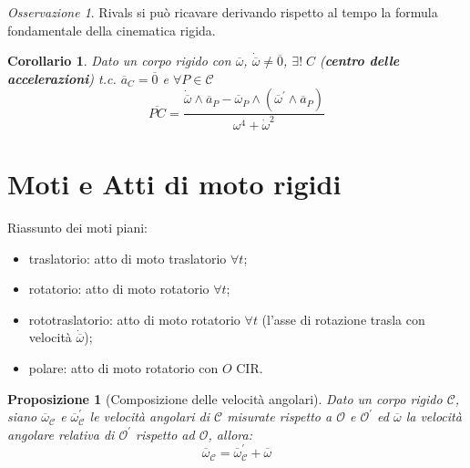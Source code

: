 \documentclass{book}
\theoremstyle{plain}
\theoremstyle{plain}
\theoremstyle{plain}
\theoremstyle{plain}
\newtheorem*{cor}{Corollario}
\theoremstyle{plain}
\newtheorem{prop}{Proposizione}[chapter]
\theoremstyle{definition}
\theoremstyle{remark}
\newtheorem*{oss}{Osservazione}
\theoremstyle{definition}
\begin{document}
\begin{oss}
    Rivals si può ricavare derivando rispetto al tempo la formula fondamentale della cinematica rigida.
\end{oss}

\begin{cor}
    Dato un corpo rigido con $\overline{\omega}$, $\dot{\overline{\omega}} \neq \overline{0}$, $\exists!\;C$ (\textbf{centro delle accelerazioni}) t.c. $\overline{a}_{C}=\overline{0}$ e $\forall P \in \mathcal{C}$
    \begin{displaymath}
        \overline{PC}=\frac{\dot{\overline{\omega}} \wedge \overline{a}_{P}-\overline{\omega}_{P} \wedge\left(\overline{\omega}^{\prime} \wedge \overline{a}_{P}\right)}{\omega^{4}+\dot{\omega}^2}
    \end{displaymath}
\end{cor}

\section{Moti e Atti di moto rigidi}

Riassunto dei moti piani:

\begin{itemize}
    \item traslatorio: atto di moto traslatorio $\forall t$;
    \item rotatorio: atto di moto rotatorio $\forall t$;
    \item rototraslatorio: atto di moto rotatorio $\forall t$ (l'asse di rotazione trasla con velocità $\dot{\overline{\omega}}$);
    \item polare: atto di moto rotatorio con $O$ CIR.
\end{itemize}

\begin{prop}[Composizione delle velocità angolari]
    Dato un corpo rigido $\mathcal{C}$, siano $\overline{\omega}_{\mathcal{C}}$ e $\overline{\omega}_{\mathcal{C}}^{\prime}$ le velocità angolari di $\mathcal{C}$ misurate rispetto a $\mathcal{O}$ e $\mathcal{O}^{\prime}$ ed $\overline{\omega}$ la velocità angolare relativa di $\mathcal{O}^{\prime}$ rispetto ad $\mathcal{O}$, allora:
    \begin{displaymath}
    \boxed{
        \overline{\omega}_{\mathcal{C}}=\overline{\omega}_{\mathcal{C}}^{\prime}+\overline{\omega}
        }
    \end{displaymath}
\end{prop}
\end{document}
